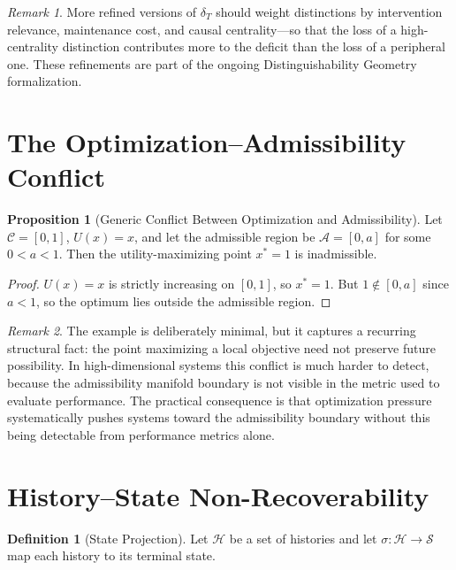 \documentclass[11pt, oneside]{book}
\theoremstyle{definition}
\newtheorem{definition}{Definition}[chapter]
\newtheorem{proposition}{Proposition}[chapter]
\theoremstyle{remark}
\newtheorem{remark}{Remark}[chapter]
\begin{document}
\begin{remark}
More refined versions of $\delta_T$ should weight distinctions by intervention relevance, maintenance cost, and causal centrality---so that the loss of a high-centrality distinction contributes more to the deficit than the loss of a peripheral one. These refinements are part of the ongoing Distinguishability Geometry formalization.
\end{remark}

\section{The Optimization--Admissibility Conflict}

\begin{proposition}[Generic Conflict Between Optimization and Admissibility]
Let $\mathcal{C}=[0,1]$, $U(x)=x$, and let the admissible region be $\mathcal{A}=[0,a]$ for some $0<a<1$. Then the utility-maximizing point $x^* = 1$ is inadmissible.
\end{proposition}

\begin{proof}
$U(x)=x$ is strictly increasing on $[0,1]$, so $x^* = 1$. But $1 \notin [0,a]$ since $a < 1$, so the optimum lies outside the admissible region.
\end{proof}

\begin{remark}
The example is deliberately minimal, but it captures a recurring structural fact: the point maximizing a local objective need not preserve future possibility. In high-dimensional systems this conflict is much harder to detect, because the admissibility manifold boundary is not visible in the metric used to evaluate performance. The practical consequence is that optimization pressure systematically pushes systems toward the admissibility boundary without this being detectable from performance metrics alone.
\end{remark}

\section{History--State Non-Recoverability}

\begin{definition}[State Projection]
Let $\mathcal{H}$ be a set of histories and let $\sigma:\mathcal{H}\to\mathcal{S}$ map each history to its terminal state.
\end{definition}
\end{document}
